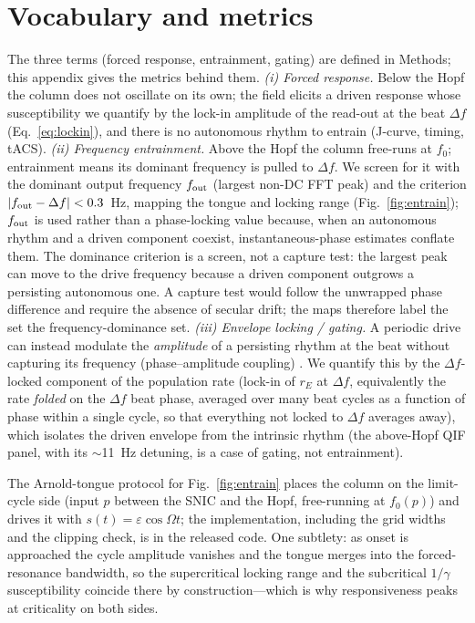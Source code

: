 \documentclass[11pt,a4paper]{article}
\begin{document}
\section{Vocabulary and metrics}\label{sec:vocab}
The three terms (forced response, entrainment, gating) are defined in Methods; this
appendix gives the metrics behind them.
\emph{(i) Forced response.} Below the Hopf the column does not oscillate on its own; the
field elicits a driven response whose susceptibility we quantify by the lock-in amplitude
of the read-out at the beat $\Delta f$ (Eq.~\eqref{eq:lockin}), and there is no autonomous
rhythm to entrain (J-curve, timing, tACS).
\emph{(ii) Frequency entrainment.} Above the Hopf the column free-runs at $f_0$;
entrainment means its dominant frequency is pulled to $\Delta f$. We screen for it with
the dominant output frequency $f_{\rm out}$ (largest non-DC FFT peak) and the criterion
$|f_{\rm out}-\Delta f|<0.3$~Hz, mapping the tongue and locking range
(Fig.~\ref{fig:entrain}); $f_{\rm out}$ is used rather than a phase-locking value
\cite{lachaux1999} because, when an autonomous rhythm and a driven component coexist,
instantaneous-phase estimates conflate them. The dominance criterion is a screen, not a
capture test: the largest peak can move to the drive frequency because a driven component
outgrows a persisting autonomous one. A capture test would follow the unwrapped phase
difference and require the absence of secular drift; the maps therefore label the set the
frequency-dominance set.
\emph{(iii) Envelope locking / gating.} A periodic drive can instead modulate the
\emph{amplitude} of a persisting rhythm at the beat without capturing its
frequency (phase--amplitude coupling) \cite{canolty2010,tort2010}. We quantify this by
the $\Delta f$-locked component of the population rate (lock-in of $r_E$ at $\Delta f$,
equivalently the rate \emph{folded} on the $\Delta f$ beat phase, averaged over many beat
cycles as a function of phase within a single cycle, so that everything not locked to
$\Delta f$ averages away), which isolates the driven envelope from the intrinsic rhythm (the above-Hopf QIF panel,
with its $\sim$11~Hz detuning, is a case of gating, not entrainment).

The Arnold-tongue protocol for Fig.~\ref{fig:entrain} places the column on the limit-cycle side (input $p$ between the SNIC and the Hopf, free-running at $f_0(p)$) and drives it with $s(t)=\varepsilon\cos\Omega t$; the implementation, including the grid widths and the clipping check, is in the released code. One subtlety: as onset is approached the cycle amplitude vanishes and the tongue merges into the forced-resonance bandwidth, so the supercritical locking range and the subcritical $1/\gamma$ susceptibility coincide there by construction---which is why responsiveness peaks at criticality on both sides.
\end{document}

